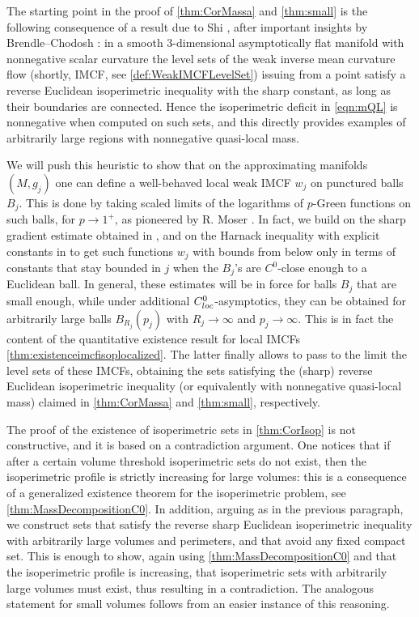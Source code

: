 \documentclass[a4paper,12pt,reqno]{amsart}
\numberwithin{equation}{section}
\theoremstyle{plain}
\theoremstyle{definition}
\theoremstyle{remark}
\begin{document}
The starting point in the proof of \cref{thm:CorMassa} and \cref{thm:small} is the following consequence of a result due to Shi \cite{Shi}, after important insights by Brendle--Chodosh \cite{brendle-chodosh}: in a smooth $3$-dimensional asymptotically flat manifold with nonnegative scalar curvature the level sets of the weak inverse mean curvature flow (shortly, IMCF, see \cref{def:WeakIMCFLevelSet}) issuing from a point satisfy a reverse Euclidean isoperimetric inequality with the sharp constant, as long as their boundaries are connected.
Hence the isoperimetric deficit in \eqref{eqn:mQL} is nonnegative when computed on such sets, and this directly provides examples of arbitrarily large regions with nonnegative quasi-local mass.

We will push this heuristic to show that on the approximating manifolds $(M,g_j)$ one can define a well-behaved local weak IMCF $w_j$ on punctured balls $B_j$. This is done by taking scaled limits of the logarithms of $p$-Green functions on such balls, for $p\to 1^+$, as pioneered by R. Moser \cite{MoserIMCF}. In fact, we build on the sharp gradient estimate obtained in \cite{kotschwar_localgradientestimatesharmonic_2009}, and on the Harnack inequality with explicit constants in \cite{salvatori-rigoli-vignati} to get such functions $w_j$ with bounds from below only in terms of constants that stay bounded in $j$ when the $B_j$'s are $C^0$-close enough to a Euclidean ball. In general, these estimates will be in force for balls $B_j$ that are small enough, while under additional $C^0_{\rm loc}$-asymptotics, they can be obtained for arbitrarily large balls $B_{R_j}(p_j)$ with $R_j \to \infty$ and $p_j \to \infty$.  This is in fact the content of the quantitative existence result for local IMCFs  \cref{thm:existenceimcfisoplocalized}. The latter finally allows to pass to the limit the level sets of these IMCFs, obtaining the sets satisfying the (sharp) reverse Euclidean isoperimetric inequality (or equivalently with nonnegative quasi-local mass) claimed in \cref{thm:CorMassa} and \cref{thm:small}, respectively. 
\medskip

The proof of the existence of isoperimetric sets in \cref{thm:CorIsop} is not constructive, and it is based on a contradiction argument. 
One notices that if 
after a certain volume threshold isoperimetric sets do not exist,
then the isoperimetric profile is strictly increasing for large volumes: this is a consequence of a generalized existence theorem for the isoperimetric problem, see \cref{thm:MassDecompositionC0}.
In addition, arguing as in the previous paragraph, we construct sets that satisfy the reverse sharp Euclidean isoperimetric inequality with arbitrarily large volumes and perimeters, and that avoid any fixed compact set. This is enough to show, again using \cref{thm:MassDecompositionC0} and that the isoperimetric profile is increasing, that isoperimetric sets with arbitrarily large volumes must exist, thus resulting in a contradiction.
The analogous statement for small volumes follows from an easier instance of this reasoning.
\end{document}
